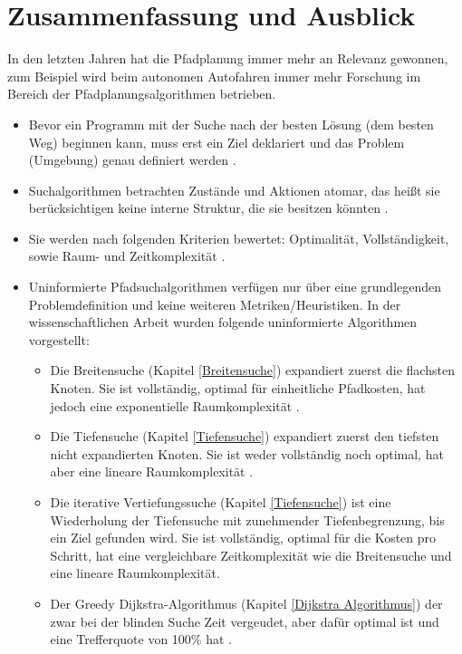 \chapter{Zusammenfassung und Ausblick}
\label{Zusammenfassung und Ausblick}
In den letzten Jahren hat die Pfadplanung immer mehr an Relevanz gewonnen, zum Beispiel wird beim autonomen Autofahren immer mehr Forschung 
im Bereich der Pfadplanungsalgorithmen betrieben. \cite{Karur:21}
\noindent \\
\begin{itemize}
    \item Bevor ein Programm mit der Suche nach der besten Lösung (dem besten Weg) beginnen kann, muss erst ein Ziel deklariert und das Problem (Umgebung) genau definiert werden \cite[108,109]{Russell:10}.
    \item Suchalgorithmen betrachten Zustände und Aktionen atomar, das heißt sie berücksichtigen keine interne Struktur, die sie besitzen könnten \cite[108,109]{Russell:10}.
    \item Sie werden nach folgenden Kriterien bewertet: Optimalität, Vollständigkeit, sowie Raum- und Zeitkomplexität \cite[80]{Russell:10}.
    \item Uninformierte Pfadsuchalgorithmen verfügen nur über eine grundlegenden Problemdefinition und keine weiteren Metriken/Heuristiken. In der wissenschaftlichen Arbeit wurden folgende uninformierte Algorithmen vorgestellt:
    \begin{itemize}
        \item Die Breitensuche (Kapitel \ref{Breitensuche}) expandiert zuerst die flachsten Knoten. Sie ist vollständig, optimal für einheitliche Pfadkosten, hat jedoch eine exponentielle Raumkomplexität \cite[81]{Russell:10}.
        \item Die Tiefensuche (Kapitel \ref{Tiefensuche}) expandiert zuerst den tiefsten nicht expandierten Knoten. Sie ist weder vollständig noch optimal, hat aber eine lineare Raumkomplexität \cite[85,86]{Russell:10}.
        \item Die iterative Vertiefungssuche (Kapitel \ref{Tiefensuche}) ist eine Wiederholung der Tiefensuche mit zunehmender Tiefenbegrenzung, bis ein Ziel gefunden wird. Sie ist vollständig, optimal für die Kosten pro Schritt, hat eine vergleichbare Zeitkomplexität wie die Breitensuche und eine lineare Raumkomplexität\cite[85,86]{Russell:10}.
        \item Der Greedy Dijkstra-Algorithmus (Kapitel \ref{Dijkstra Algorithmus}) der zwar bei der blinden Suche Zeit vergeudet, aber dafür optimal ist und eine Trefferquote von 100\% hat \cite{Karur:21}.

\end{itemize}
\end{itemize}
